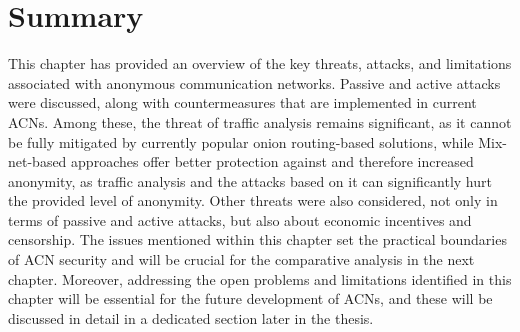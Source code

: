 \section{Summary}
This chapter has provided an overview of the key threats, attacks, and limitations associated with anonymous communication networks. Passive and active attacks were discussed, along with countermeasures that are implemented in current ACNs. Among these, the threat of traffic analysis remains significant, as it cannot be fully mitigated by currently popular onion routing-based solutions, while Mix-net-based approaches offer better protection against and therefore increased anonymity, as traffic analysis and the attacks based on it can significantly hurt the provided level of anonymity. Other threats were also considered, not only in terms of passive and active attacks, but also about economic incentives and censorship. The issues mentioned within this chapter set the practical boundaries of ACN security and will be crucial for the comparative analysis in the next chapter. Moreover, addressing the open problems and limitations identified in this chapter will be essential for the future development of ACNs, and these will be discussed in detail in a dedicated section later in the thesis.
